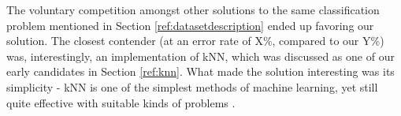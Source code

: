 \documentclass{netsec2012}
\begin{document}

\label{ref:datachallenge}

The voluntary competition amongst other solutions to the same classification problem mentioned in
Section \ref{ref:datasetdescription} ended up favoring our solution.  The closest contender (at an
error rate of X\%, compared to our Y\%) was, interestingly, an implementation of kNN, which was
discussed as one of our early candidates in Section \ref{ref:knn}.  What made the solution
interesting was its simplicity - kNN is one of the simplest methods of machine learning, yet still
quite effective with suitable kinds of problems \cite{keller1985fuzzy}.

%


%
%



\end{document}
